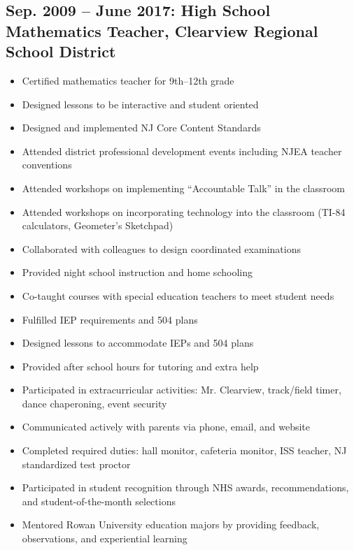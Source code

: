 \documentclass[11pt]{article}
\begin{document}
\subsection*{Sep. 2009 -- June 2017: High School Mathematics Teacher, Clearview Regional School District}
\begin{itemize}[leftmargin=*]
    \item Certified mathematics teacher for 9th--12th grade
    \item Designed lessons to be interactive and student oriented
    \item Designed and implemented NJ Core Content Standards
    \item Attended district professional development events including NJEA teacher conventions
    \item Attended workshops on implementing ``Accountable Talk'' in the classroom
    \item Attended workshops on incorporating technology into the classroom (TI-84 calculators, Geometer's Sketchpad)
    \item Collaborated with colleagues to design coordinated examinations
    \item Provided night school instruction and home schooling
    \item Co-taught courses with special education teachers to meet student needs
    \item Fulfilled IEP requirements and 504 plans
    \item Designed lessons to accommodate IEPs and 504 plans
    \item Provided after school hours for tutoring and extra help
    \item Participated in extracurricular activities: Mr. Clearview, track/field timer, dance chaperoning, event security
    \item Communicated actively with parents via phone, email, and website
    \item Completed required duties: hall monitor, cafeteria monitor, ISS teacher, NJ standardized test proctor
    \item Participated in student recognition through NHS awards, recommendations, and student-of-the-month selections
    \item Mentored Rowan University education majors by providing feedback, observations, and experiential learning
\end{itemize}
\end{document}
